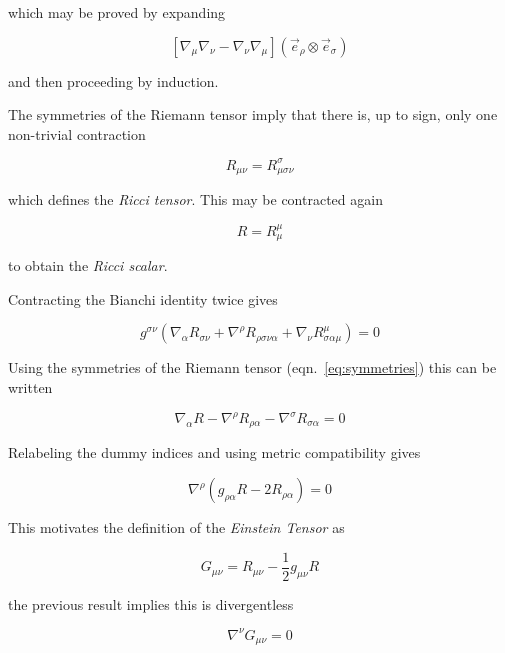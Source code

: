 which may be proved by expanding

\begin{equation*}
\left[\nabla_\mu \nabla_\nu - \nabla_\nu \nabla_\mu\right] 
(\vec{e}_\rho \otimes \vec{e}_\sigma)
\end{equation*}

and then proceeding by induction.  

The symmetries of the Riemann tensor imply that there is, up to sign,
only one non-trivial contraction

\begin{equation}
R_{\mu\nu} = R^\sigma_{\mu\sigma\nu}
\end{equation}

which defines the \emph{Ricci tensor}.  This may be contracted again

\begin{equation}
R = R^\mu_\mu
\end{equation}

to obtain the \emph{Ricci scalar}.

Contracting the Bianchi identity twice gives

\begin{equation*}
g^{\sigma\nu}
\left(\nabla_\alpha R_{\sigma\nu}
+ \nabla^\rho R_{\rho\sigma\nu\alpha}
+ \nabla_\nu R^\mu_{\sigma\alpha\mu}\right) = 0
\end{equation*}

Using the symmetries of the Riemann tensor (eqn.~\ref{eq:symmetries})
this can be written

\begin{equation*}
\nabla_\alpha R
- \nabla^\rho R_{\rho\alpha}
- \nabla^\sigma R_{\sigma\alpha} = 0
\end{equation*}

Relabeling the dummy indices and using metric compatibility gives

\begin{equation*}
\nabla^\rho \left(g_{\rho\alpha} R - 2 R_{\rho\alpha} \right) = 0
\end{equation*}

This motivates the definition of the \emph{Einstein Tensor} as

\begin{equation}
\label{eq:einstein_tensor}
G_{\mu\nu} = R_{\mu\nu} - \frac{1}{2} g_{\mu\nu} R
\end{equation}

the previous result implies this is divergentless

\begin{equation*}
\nabla^\nu G_{\mu\nu} = 0
\end{equation*}

